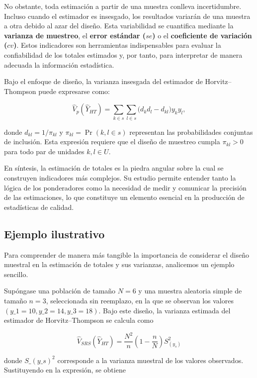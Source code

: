 \documentclass[
  spanish,
  12pt,
]{book}
\begin{document}
No obstante, toda estimación a partir de una muestra conlleva incertidumbre. Incluso cuando el estimador es insesgado, los resultados variarán de una muestra a otra debido al azar del diseño. Esta variabilidad se cuantifica mediante la \textbf{varianza de muestreo}, el \textbf{error estándar (\(se\))} o el \textbf{coeficiente de variación (\(cv\))}. Estos indicadores son herramientas indispensables para evaluar la confiabilidad de los totales estimados y, por tanto, para interpretar de manera adecuada la información estadística.

Bajo el enfoque de diseño, la varianza insesgada del estimador de Horvitz--Thompson puede expresarse como:

\[
\hat{V}_p(\hat{Y}_{HT}) = \sum_{k \in s} \sum_{l \in s} \bigl( d_k d_l - d_{kl} \bigr) y_k y_l,
\]

donde \(d_{kl} = 1/\pi_{kl}\) y \(\pi_{kl} = \Pr(k,l \in s)\) representan las probabilidades conjuntas de inclusión. Esta expresión requiere que el diseño de muestreo cumpla \(\pi_{kl} > 0\) para todo par de unidades \(k,l \in U\).

En síntesis, la estimación de totales es la piedra angular sobre la cual se construyen indicadores más complejos. Su estudio permite entender tanto la lógica de los ponderadores como la necesidad de medir y comunicar la precisión de las estimaciones, lo que constituye un elemento esencial en la producción de estadísticas de calidad.

\subsection{Ejemplo ilustrativo}\label{ejemplo-ilustrativo-1}

Para comprender de manera más tangible la importancia de considerar el diseño muestral en la estimación de totales y sus varianzas, analicemos un ejemplo sencillo.

Supóngase una población de tamaño \(N=6\) y una muestra aleatoria simple de tamaño \(n=3\), seleccionada sin reemplazo, en la que se observan los valores \((y\_1=10, y\_2=14, y\_3=18)\). Bajo este diseño, la varianza estimada del estimador de Horvitz--Thompson se calcula como

\[
\hat{V}_{SRS}(\hat{Y}_{HT}) = \frac{N^2}{n}\left(1-\frac{n}{N}\right)S_{(y_s)}^2 \tag{9-5}
\]

donde \(S\_{(y\_s)}^2\) corresponde a la varianza muestral de los valores observados. Sustituyendo en la expresión, se obtiene
\end{document}
